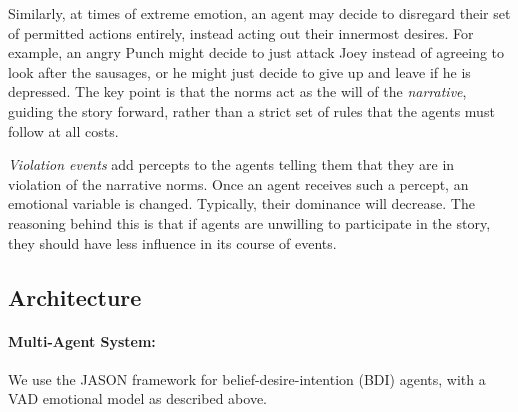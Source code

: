 \documentclass[11pt]{report}
\begin{document}
Similarly, at times of extreme emotion, an agent may decide to disregard their set of permitted actions entirely, instead acting out their innermost desires. For example, an angry Punch might decide to just attack Joey instead of agreeing to look after the sausages, or he might just decide to give up and leave if he is depressed. The key point is that the norms act as the will of the \emph{narrative}, guiding the story forward, rather than a strict set of rules that the agents must follow at all costs.

\emph{Violation events\/} add percepts to the agents telling them that they are in violation of the narrative norms. Once an agent receives such a percept, an emotional variable is changed. Typically, their dominance will decrease. The reasoning behind this is that if agents are unwilling to participate in the story, they should have less influence in its course of events.

\subsection{Architecture}\label{sec:arch}

\paragraph{Multi-Agent System:} \label{sec:arch-mas}
We use the JASON framework for belief-desire-intention (BDI) agents, with a VAD
emotional model as described above.
\end{document}
